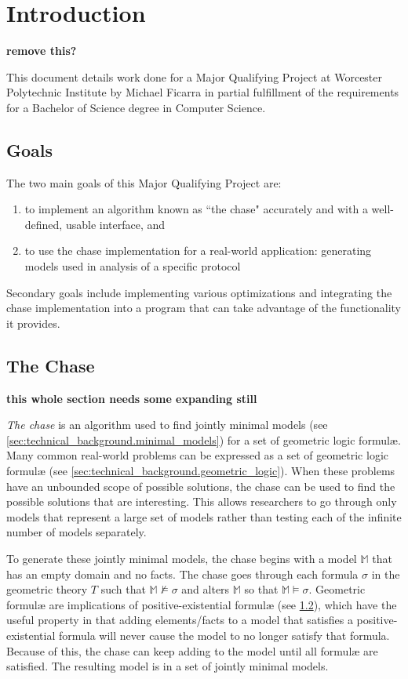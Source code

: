 \section{Introduction}

	\textbf{ remove this? }

	This document details work done for a Major Qualifying Project at Worcester
	Polytechnic Institute by Michael Ficarra in partial fulfillment of the
	requirements for a Bachelor of Science degree in Computer Science.

	\subsection{Goals}

		The two main goals of this Major Qualifying Project are:

		\begin{enumerate}
		\item to implement an algorithm known as ``the chase" accurately
		and with a well-defined, usable interface, and
		\item to use the chase implementation for a real-world
		application: generating models used in analysis of a specific protocol
		\end{enumerate}

		Secondary goals include implementing various optimizations and
		integrating the chase implementation into a program that can take
		advantage of the functionality it provides.

	\subsection{The Chase}

		\textbf{ this whole section needs some expanding still }

		\emph{The chase} is an algorithm used to find jointly minimal models
		(see \ref{sec:technical_background.minimal_models}) for a set of
		geometric logic formul{\ae}. Many common real-world problems can be
		expressed as a set of geometric logic formul{\ae} (see
		\ref{sec:technical_background.geometric_logic}). When these problems
		have an unbounded scope of possible solutions, the chase can be used to
		find the possible solutions that are interesting. This allows
		researchers to go through only models that represent a large set of
		models rather than testing each of the infinite number of models
		separately.

		To generate these jointly minimal models, the chase begins with a model
		$\mathbb{M}$ that has an empty domain and no facts. The chase goes
		through each formula $\sigma$ in the geometric theory $T$ such that
		$\mathbb{M} \not\models \sigma$ and alters $\mathbb{M}$ so that
		$\mathbb{M} \models \sigma$. Geometric formul{\ae} are implications of
		positive-existential formul{\ae} (see \ref{}), which have the useful
		property in that adding elements/facts to a model that satisfies a
		positive-existential formula will never cause the model to no longer
		satisfy that formula. Because of this, the chase can keep adding to the
		model until all formul{\ae} are satisfied. The resulting model is in a
		set of jointly minimal models.

